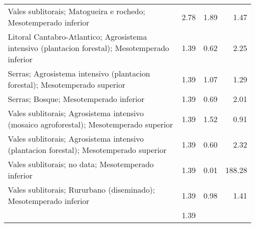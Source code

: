 \begin{table}[p]
\begin{tabular}{lrrr}
  Vales sublitorais; Matogueira e rochedo; Mesotemperado inferior & 2.78 & 1.89 & 1.47 \\ 
  Litoral Cantabro-Atlantico; Agrosistema intensivo (plantacion forestal); Mesotemperado inferior & 1.39 & 0.62 & 2.25 \\ 
  Serras; Agrosistema intensivo (plantacion forestal); Mesotemperado superior & 1.39 & 1.07 & 1.29 \\ 
  Serras; Bosque; Mesotemperado inferior & 1.39 & 0.69 & 2.01 \\ 
  Vales sublitorais; Agrosistema intensivo (mosaico agroforestal); Mesotemperado superior & 1.39 & 1.52 & 0.91 \\ 
  Vales sublitorais; Agrosistema intensivo (plantacion forestal); Mesotemperado superior & 1.39 & 0.60 & 2.32 \\ 
  Vales sublitorais; no data; Mesotemperado inferior & 1.39 & 0.01 & 188.28 \\ 
  Vales sublitorais; Rururbano (diseminado); Mesotemperado inferior & 1.39 & 0.98 & 1.41 \\ 
   & 1.39 &  &  \\ 
   \hline
\end{tabular}
\end{table}
